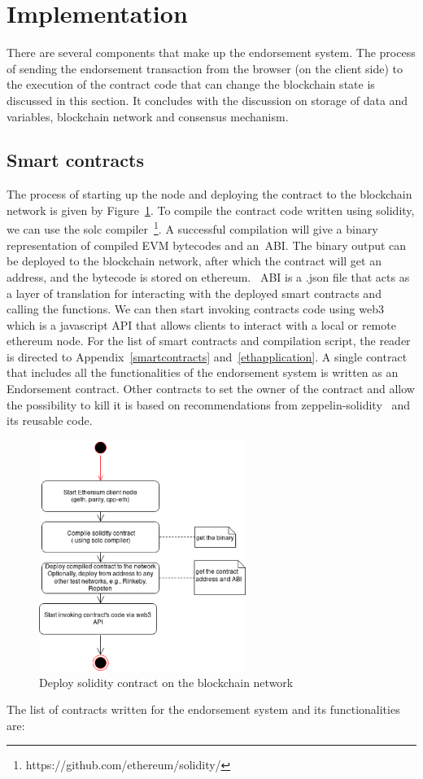 \section{Implementation} \label{sec:implementation}
There are several components that make up the endorsement system. The process
of sending the endorsement transaction from the browser (on the client side) to
the execution of the contract code that can change the blockchain state is
discussed in this section. It concludes with the discussion on storage of data
and variables, blockchain network and consensus mechanism.
\subsection{Smart contracts} \label{subsec:smartcontracts} The process of
starting up the node and deploying the contract to the blockchain network is
given by Figure~\ref{fig:startup}. To compile the contract code written using
solidity, we can use the solc
compiler~\footnote{https://github.com/ethereum/solidity/}. A successful
compilation will give a binary representation of compiled EVM bytecodes and
an~\ac{ABI}. The binary output can be deployed to the blockchain network, after
which the contract will get an address, and the bytecode is stored on ethereum.
~\ac{ABI} is a .json file that acts as a layer of translation for interacting
with the deployed smart contracts and calling the functions. We can then start
invoking contracts code using web3~\cite{web3} which is a javascript API that
allows clients to interact with a local or remote ethereum node. For the
list of smart contracts and compilation script, the reader is directed to
Appendix~\ref{smartcontracts} and~\ref{ethapplication}. A single contract that
includes all the functionalities of the endorsement system is written as an
Endorsement contract. Other contracts to set the owner of the contract and
allow the possibility to kill it is based on recommendations from
zeppelin-solidity~\cite{zeppelin-solidity} and its reusable code. \par  
\begin{figure}
	\centering
	\includegraphics[width=0.6\textwidth]{Images/DeployContract.eps}
	\caption{Deploy solidity contract on the blockchain network}
	\label{fig:startup}
\end{figure}
The list of contracts written for the endorsement system and its
functionalities are: 
